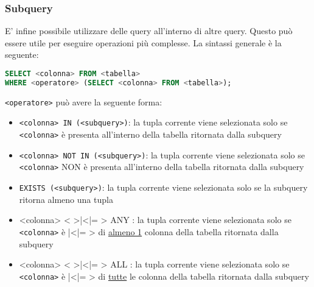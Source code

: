 \subsubsection{Subquery}
E' infine possibile utilizzare delle query all'interno di altre query. Questo può essere utile per eseguire operazioni più complesse. La sintassi generale è la seguente:
\begin{lstlisting}[language = SQL, style = SQL, frame = none] 
SELECT <colonna> FROM <tabella> 
WHERE <operatore> (SELECT <colonna> FROM <tabella>); 
\end{lstlisting}
\verb|<operatore>| può avere la seguente forma:
\begin{itemize}
	\item \verb|<colonna> IN (<subquery>)|: la tupla corrente viene selezionata solo se \verb|<colonna>| è presenta all'interno della tabella ritornata dalla subquery
	\item \verb|<colonna> NOT IN (<subquery>)|: la tupla corrente viene selezionata solo se \verb|<colonna>| NON è presenta all'interno della tabella ritornata dalla subquery
	\item \verb|EXISTS (<subquery>)|: la tupla corrente viene selezionata solo se la subquery ritorna almeno una tupla
	\item {\ttfamily <colonna> < >|<|= > ANY }: la tupla corrente viene selezionata solo se \verb|<colonna>| è {\ttfamily < >|<|= >} di \underline{almeno 1} colonna della tabella ritornata dalla subquery
	\item {\ttfamily <colonna> < >|<|= > ALL }: la tupla corrente viene selezionata solo se \verb|<colonna>| è {\ttfamily < >|<|= >} di \underline{tutte} le colonna della tabella ritornata dalla subquery
\end{itemize}

